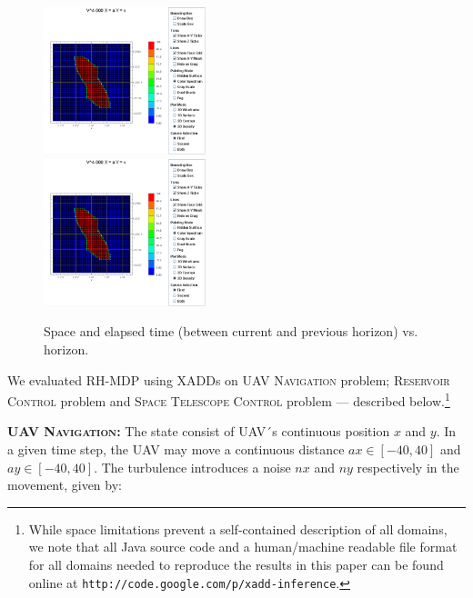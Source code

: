 \begin{figure}[tbp!]
\vspace{-2mm}
\centering

\includegraphics[width=0.42\textwidth]{Figures/telescope.png}\\
\vspace{-2mm}
\includegraphics[width=0.42\textwidth]{Figures/telescope.png}

\vspace{-2mm}
\caption{\footnotesize Space and elapsed time (between current and previous horizon) vs. horizon.
}
\label{fig:SpaceTime}
\vspace{-4mm}
\end{figure}

\label{sec:results}

We evaluated RH-MDP using XADDs on
\textsc{UAV Navigation} problem;
\textsc{Reservoir Control} problem and
\textsc{Space Telescope Control} problem --- described below.\footnote{While
space limitations prevent a self-contained
description of all domains, we note that all Java source code and a
human/machine readable file format for all domains needed to reproduce
the results in this paper can be found online at
\texttt{http://code.google.com/p/xadd-inference}.}

{\bf \textsc{UAV Navigation}:} The state consist of UAV´s continuous position $x$ and $y$. 
In a given time step, the UAV may move a continuous distance $ax \in [-40,40]$ and $ay \in [-40,40]$. The turbulence introduces a noise $nx$ and $ny$ respectively in the movement, given by:

